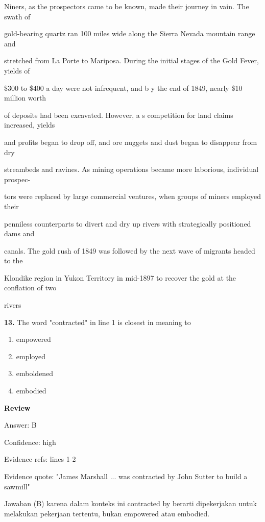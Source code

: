 \documentclass[12pt]{article}
\begin{document}
Niners, as the prospectors came to be known, made their journey in vain. The swath of\par
gold-bearing quartz ran 100 miles wide along the Sierra Nevada mountain range and\par
stretched from La Porte to Mariposa. During the initial stages of the Gold Fever, yields of\par
\$300 to \$400 a day were not infrequent, and b y the end of 1849, nearly \$10 million worth\par
of deposits had been excavated. However, a s competition for land claims increased, yields\par
and profits began to drop off, and ore nuggets and dust began to disappear from dry\par
streambeds and ravines. As mining operations became more laborious, individual prospec-\par
tors were replaced by large commercial ventures, when groups of miners employed their\par
penniless counterparts to divert and dry up rivers with strategically positioned dams and\par
canals. The gold rush of 1849 was followed by the next wave of migrants headed to the\par
Klondike region in Yukon Territory in mid-1897 to recover the gold at the conflation of two\par
rivers\par
\endgroup
\medskip
\noindent\textbf{13.} The word "contracted" in line 1 is closest in meaning to
\begin{enumerate}[label=(\Alph*),leftmargin=*,itemsep=0.2em]
\item empowered
\item employed
\item emboldened
\item embodied
\end{enumerate}
\par
\begingroup
\setlength{\parskip}{0pt}
\setlength{\parindent}{0pt}
\textbf{Review}\par
Answer: B\par
Confidence: high\par
Evidence refs: lines 1-2\par
Evidence quote: "James Marshall ... was contracted by John Sutter to build a sawmill"\par
Jawaban (B) karena dalam konteks ini contracted by berarti dipekerjakan untuk melakukan pekerjaan tertentu, bukan empowered atau embodied.\par
\end{document}
